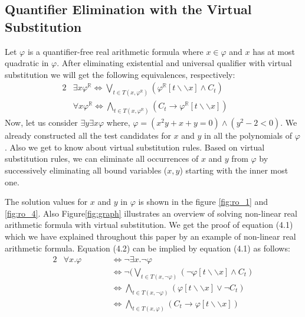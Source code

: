 \subsection{Quantifier Elimination with the Virtual Substitution}
\label{sec:quantifier-elimination-with-the-virtual-substitution}
Let $\varphi$ is a quantifier-free real arithmetic formula where $x\in \varphi$ and $x$ has at most quadratic in $\varphi$. After eliminating existential and universal qualifier with virtual substitution we will get the following equivalences, respectively:
\begin{alignat}{2}
	&\exists x \varphi^\mathbb{R} \Longleftrightarrow \bigvee\limits_{t\in T(x,\varphi^\mathbb{R})}  (\varphi^\mathbb{R} [t\backslash\backslash x] \wedge C_t)\qquad   \\
	& \forall x \varphi^\mathbb{R} \Longleftrightarrow \bigwedge\limits_{t\in T(x,\varphi^\mathbb{R})}  (C_{t}\rightarrow\varphi^\mathbb{R} [t\backslash\backslash x] )\qquad
\end{alignat}
Now, let us consider $\exists y\exists x\varphi$ where, $\varphi = (x^{2}y + x + y = 0) \wedge (y^{2} -2 < 0)$. We already constructed all the test candidates for $x$ and $y$ in all the polynomials of $\varphi$. Also we get to know about virtual substitution rules. Based on virtual substitution rules, we can eliminate all occurrences of $x$ and $y$ from $\varphi$ by successively eliminating all bound variables ($x,y$) starting with the inner most one.
\begin{center}

\end{center}
The solution values for $x$ and $y$ in $\varphi$ is shown in the figure \ref{fig:ro_1} and \ref{fig:ro_4}. Also Figure\ref{fig:graph} illustrates an overview of solving non-linear real arithmetic formula with virtual substitution.\newline
We get the proof of equation (4.1) which we have explained throughout this paper by an example of non-linear real arithmetic formula. Equation (4.2) can be implied by equation (4.1) as follows:
\begin{alignat}{2}
	& \forall x. \varphi\qquad   
	&&\stackrel{}{\Longleftrightarrow} \neg\exists x.\neg\varphi \\
	& 
	&&\stackrel{}{\Longleftrightarrow} \neg(\bigvee\limits_{t\in T(x,\neg \varphi)}
	(\neg\varphi [t\backslash\backslash x] \wedge C_t) \\
	& 
	&&\stackrel{}{\Longleftrightarrow} \bigwedge\limits_{t\in T(x,\neg \varphi)} (\varphi [t\backslash\backslash x] \vee\neg C_{t}) \\
	& 
	&&\stackrel{}{\Longleftrightarrow}  \bigwedge\limits_{t\in T(x, \varphi)} (C_{t} \rightarrow \varphi [t\backslash\backslash x])
\end{alignat}
